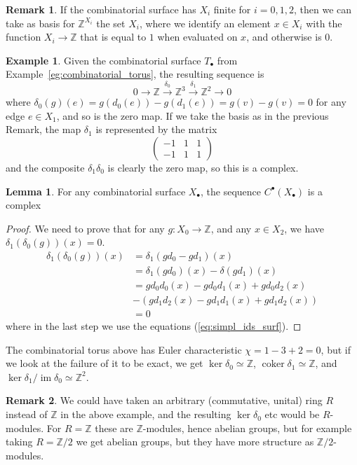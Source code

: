\documentclass{tufte-handout}
\def\ZZ{\mathbb{Z}}
\DeclareMathOperator{\coker}{coker}
\DeclareMathOperator{\im}{im}
\theoremstyle{definition}
\newtheorem{lemma}{Lemma}
\newtheorem{example}{Example}
\newtheorem*{rem}{Remark}
\begin{document}
\begin{rem}\label{rem:basis_finite_complex}
If the combinatorial surface has $X_i$ finite for $i=0,1,2$, then we can 
take as basis for $\ZZ^{X_i}$ the set $X_i$, where we identify an element $x\in X_i$ with 
the function $X_i\to \ZZ$ that is equal to $1$ when evaluated on $x$, and otherwise is $0$.
\end{rem}

\begin{example}
Given the combinatorial surface $T_\bullet$ from Example~\ref{eg:combinatorial_torus}, the 
resulting sequence is 
\[
	0 \to \ZZ \xrightarrow{\delta_0} \ZZ^3 \xrightarrow{\delta_1} \ZZ^2 \to 0
\]
where $\delta_0(g)(e) = g(d_0(e)) - g(d_1(e)) = g(v) - g(v) = 0$ for any edge $e\in X_1$, and so
is the zero map. If we take the basis as in the previous
Remark, the map $\delta_1$ is represented by the matrix
\[
	\begin{pmatrix}
	-1&1&1 \\
	-1&1&1
	\end{pmatrix}
\] 
and the composite $\delta_1\delta_0$ is clearly the zero map, so this is a complex.
\end{example}

\begin{lemma}
For any combinatorial surface $X_\bullet$, the sequence $C^\bullet(X_\bullet)$ is a complex
\end{lemma}

\begin{proof}
We need to prove that for any $g\colon X_0\to \ZZ$, and any $x\in X_2$, we have
$\delta_1(\delta_0(g))(x) = 0$.
\begin{align*}
\delta_1(\delta_0(g))(x) & = \delta_1(g d_0 - gd_1)(x)\\
			 & = \delta_1(gd_0)(x) - \delta(gd_1)(x)\\
			 & = gd_0d_0(x) - gd_0d_1(x) + gd_0d_2(x) \\
			 & - (gd_1d_2(x) - gd_1d_1(x) + gd_1d_2(x))\\
			 & = 0 
\end{align*}
where in the last step we use the equations (\ref{eq:simpl_ids_surf}).
\end{proof}

The combinatorial torus above has Euler characteristic $\chi=1 - 3 + 2 = 0$, but if we look
at the failure of it to be exact, we get $\ker\delta_0 \simeq \ZZ$, $\coker\delta_1 \simeq \ZZ$, and 
$\ker\delta_1/\im\delta_0 \simeq \ZZ^2$.

\begin{rem}
We could have taken an arbitrary (commutative, unital) ring $R$ instead of $\ZZ$ in the 
above example, and the resulting $\ker\delta_0$ etc would be $R$-modules. For $R=\ZZ$ these are
$\ZZ$-modules, hence abelian groups, but for example taking $R=\ZZ/2$ we get abelian groups, 
but they have more structure as $\ZZ/2$-modules.
\end{rem}
\end{document}
